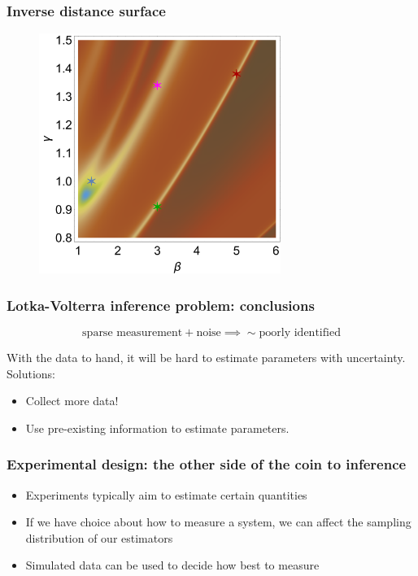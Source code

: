 \documentclass[handout]{beamer}
\begin{document}
\begin{frame}
	\frametitle{Inverse distance surface}
	
	\begin{figure}[ht]
		\centerline{\includegraphics[width=0.7\textwidth]{./figures/lotka-volterra-inference-big.png}}
	\end{figure}
	
\end{frame}

\begin{frame}
	\frametitle{Lotka-Volterra inference problem: conclusions}
	
	\begin{equation}
	\text{sparse measurement} + \text{noise} \implies \sim \text{poorly identified}
	\end{equation}
	
	With the data to hand, it will be hard to estimate parameters with uncertainty. Solutions:
	
	\begin{itemize}
		\item Collect more data!
		\item Use pre-existing information to estimate parameters.
	\end{itemize}
	
\end{frame}

\begin{frame}
	\frametitle{Experimental design: the other side of the coin to inference}
	
	\begin{itemize}
		\item Experiments typically aim to estimate certain quantities
		\item If we have choice about how to measure a system, we can affect the sampling distribution of our estimators
		\item Simulated data can be used to decide how best to measure
	\end{itemize}
	
\end{frame}
\end{document}
